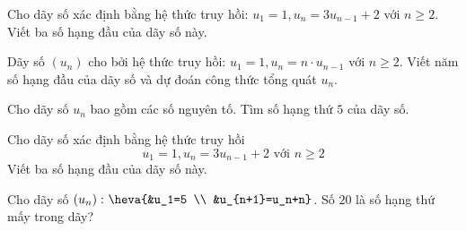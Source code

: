 \begin{vd}%
	Cho dãy số xác định bằng hệ thức truy hồi: $u_1=1, u_n=3u_{n-1}+2$ với $n\ge 2$. Viết ba số hạng đầu của dãy số này.
\end{vd}

\begin{vd}%
	Dãy số $(u_n)$ cho bởi hệ thức truy hồi: $u_1=1, u_n=n \cdot u_{n-1}$ với $n \ge 2$. Viết năm số hạng đầu của dãy số và dự đoán công thức tổng quát $u_n$.
\end{vd}

\begin{vd}%
	Cho dãy số $u_n$ bao gồm các số nguyên tố. Tìm số hạng thứ $5$ của dãy số.
\end{vd}

\begin{vd}%
	Cho dãy số xác định bằng hệ thức truy hồi
	$$
	u_1=1, u_n=3 u_{n-1}+2 \text { với } n \geq 2
	$$
	Viết ba số hạng đầu của dãy số này.
\end{vd}

\begin{vd}%
	Cho dãy số $\left(u_n\right)\colon\heva{&u_1=5 \\ &u_{n+1}=u_n+n}$. Số $20$ là số hạng thứ mấy trong dãy?
\end{vd}


